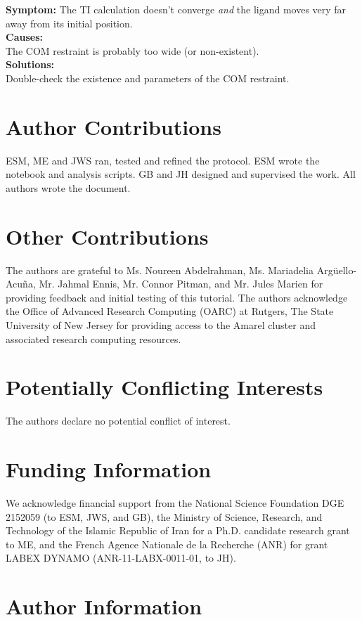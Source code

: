 \documentclass[9pt,tutorial]{Styling/livecoms}
\begin{document}
\noindent\textbf{Symptom:} The TI calculation doesn't converge \emph{and} the ligand moves very far away from its initial position. \\
\textbf{Causes:}\\
The COM restraint is probably too wide (or non-existent).\\
\textbf{Solutions:}\\
Double-check the existence and parameters of the COM restraint.\\

\setcounter{section}{3}
\renewcommand\thesection{\arabic{section}}
\section{Author Contributions}
ESM, ME and JWS ran, tested and refined the protocol.
ESM wrote the notebook and analysis scripts.
GB and JH designed and supervised the work.
All authors wrote the document.

\section{Other Contributions}
The authors are grateful to 
Ms. Noureen Abdelrahman, 
Ms. Mariadelia Arg\"uello-Acu\~na,
Mr. Jahmal Ennis, 
Mr. Connor Pitman, and
Mr. Jules Marien
for providing feedback and initial testing of this tutorial. The authors acknowledge the Office of Advanced Research Computing (OARC) at Rutgers, The State University of New Jersey for providing access to the Amarel cluster and associated research computing resources. 

\section{Potentially Conflicting Interests}
The authors declare no potential conflict of interest.


\section{Funding Information}
We acknowledge financial support from the National Science Foundation DGE 2152059 (to ESM, JWS, and GB), the Ministry of Science, Research, and Technology of the Islamic Republic of Iran for a Ph.D. candidate research grant to ME, and the French Agence Nationale de la Recherche (ANR) for grant LABEX DYNAMO (ANR-11-LABX-0011-01, to JH).

\section*{Author Information}
\makeorcid

% 

\end{document}
